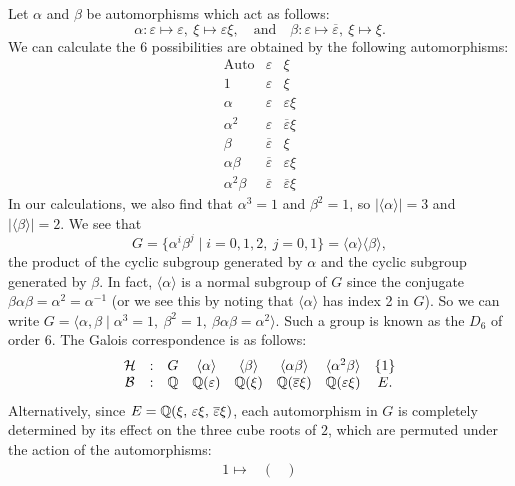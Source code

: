 \begin{example}
	Let $\alpha$ and $\beta$ be automorphisms which act as follows:
	\[
		\alpha : \varepsilon \mapsto \varepsilon,\ \xi \mapsto \varepsilon \xi, \quad \text{and} \quad \beta : \varepsilon \mapsto \overline{\varepsilon},\ \xi \mapsto \xi.
	\]
	We can calculate the 6 possibilities are obtained by the following automorphisms:
	\[
		\begin{array}{c|c|c}
			\text{Auto} & \varepsilon & \xi \\
			\hline
			1 & \varepsilon & \xi \\
			\alpha & \varepsilon & \varepsilon \xi \\
			\alpha^2 & \varepsilon & \overline{\varepsilon} \xi \\
			\beta & \overline{\varepsilon} & \xi \\
			\alpha \beta & \overline{\varepsilon} & \varepsilon \xi \\
			\alpha^2 \beta & \overline{\varepsilon} & \overline{\varepsilon} \xi
		\end{array}
	\]
	In our calculations, we also find that $\alpha^3 = 1$ and $\beta^2 = 1$, so $|\langle \alpha \rangle| = 3$ and $|\langle \beta \rangle| = 2$. We see that
	\[
		G = \{\alpha^i \beta^j \mid i = 0, 1, 2,\ j = 0, 1\} = \langle \alpha \rangle \langle \beta \rangle,
	\]
	the product of the cyclic subgroup generated by $\alpha$ and the cyclic subgroup generated by $\beta$. In fact, $\langle \alpha \rangle$ is a normal subgroup  of $G$ since the conjugate $\beta \alpha \beta = \alpha^2 = \alpha^{-1}$ (or we see this by noting that $\langle \alpha \rangle$ has index 2 in $G$). So we can write $G = \langle \alpha, \beta \mid \alpha^3 = 1,\ \beta^2 = 1,\ \beta \alpha \beta = \alpha^2 \rangle$. Such a group is known as the  $D_6$ of order 6. The Galois correspondence is as follows:
	\[
		\begin{matrix}
			\mathcal{H} & : & G & \langle \alpha \rangle & \langle \beta \rangle & \langle \alpha \beta \rangle & \langle \alpha^2 \beta \rangle & \{1\} \\
			\mathcal{B} & : & \mathbb{Q} & \mathbb{Q}(\varepsilon) & \mathbb{Q}(\xi) & \mathbb{Q}(\overline{\varepsilon} \xi) & \mathbb{Q}(\varepsilon \xi) & E.
		\end{matrix}
	\]
	Alternatively, since $E = \mathbb{Q}(\xi,\, \varepsilon \xi,\, \overline{\varepsilon} \xi)$, each automorphism in $G$ is completely determined by its effect on the three cube roots of $2$, which are permuted under the action of the automorphisms:
	\[
		\begin{matrix}
			1 \mapsto &
			\begin{pmatrix}

\end{pmatrix}
\end{matrix}\]
\end{example}
